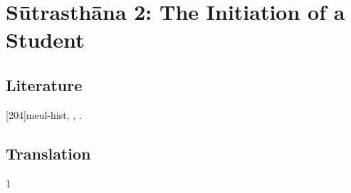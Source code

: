 
\chapter{Sūtrasthāna 2: The Initiation of a Student}


\section{Literature}

[204]{meul-hist}, \cite{prei-2007}, \cite[82--83, {\emph{et 
passim}}]{wujad-2012}. 

\section{Translation}

\begin{translation}    
    \item [1] 
    
\end{translation}



